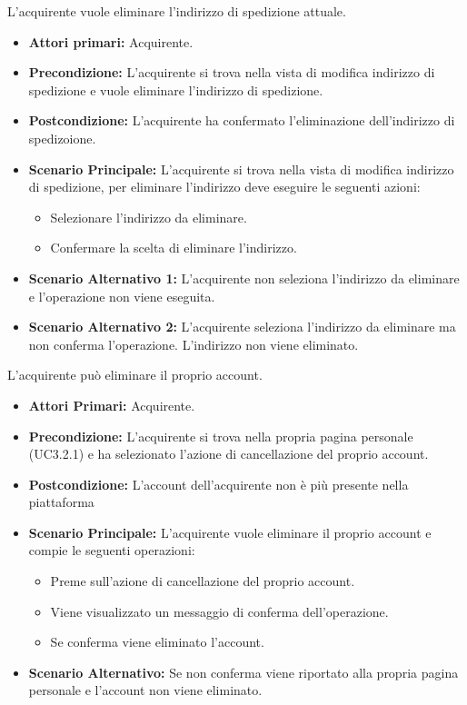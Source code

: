L'acquirente vuole eliminare l'indirizzo di spedizione attuale.
\begin{itemize}
    \item \textbf{Attori primari:} Acquirente.
    \item \textbf{Precondizione:}  L'acquirente si trova nella vista di modifica indirizzo di spedizione e vuole eliminare l'indirizzo di spedizione.
    \item \textbf{Postcondizione:} L'acquirente ha confermato l'eliminazione dell'indirizzo di spedizoione.
    \item \textbf{Scenario Principale:} L'acquirente si trova nella vista di modifica indirizzo di spedizione, per eliminare l'indirizzo deve eseguire le seguenti azioni:
        \begin{itemize}
            \item Selezionare l'indirizzo da eliminare.
            \item Confermare la scelta di eliminare l'indirizzo.
        \end{itemize}
    \item \textbf{Scenario Alternativo 1:} L'acquirente non seleziona l'indirizzo da eliminare e l'operazione non viene eseguita.
    \item \textbf{Scenario Alternativo 2:} L'acquirente seleziona l'indirizzo da eliminare ma non conferma l'operazione. L'indirizzo non viene eliminato.
\end{itemize}


L'acquirente può eliminare il proprio account.
\begin{itemize}
    \item \textbf{Attori Primari:} Acquirente.
    \item \textbf{Precondizione:} L'acquirente si trova nella propria pagina personale (UC3.2.1) e ha selezionato l'azione di cancellazione del proprio account.
    \item \textbf{Postcondizione:} L'account dell'acquirente non è più presente nella piattaforma
    \item \textbf{Scenario Principale:} L'acquirente vuole eliminare il proprio account e compie le seguenti operazioni:
    \begin{itemize}
        \item Preme sull'azione di cancellazione del proprio account.
        \item Viene visualizzato un messaggio di conferma dell'operazione.
        \item Se conferma viene eliminato l'account.
    \end{itemize}
    \item \textbf{Scenario Alternativo:} Se non conferma viene riportato alla propria pagina personale e l'account non viene eliminato.
\end{itemize}
